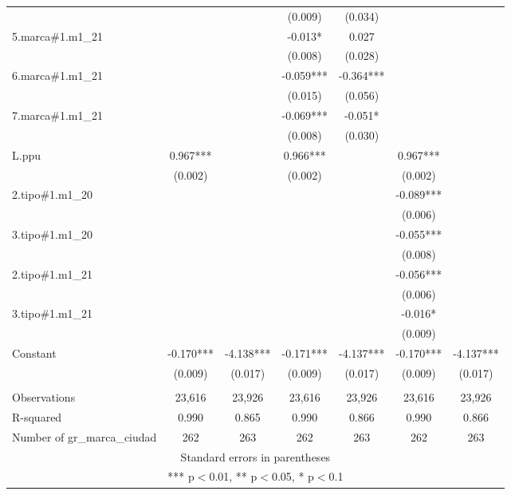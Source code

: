 \begin{tabular}{lcccccc}
 &  &  & (0.009) & (0.034) &  &  \\
5.marca\#1.m1\_21 &  &  & -0.013* & 0.027 &  &  \\
 &  &  & (0.008) & (0.028) &  &  \\
6.marca\#1.m1\_21 &  &  & -0.059*** & -0.364*** &  &  \\
 &  &  & (0.015) & (0.056) &  &  \\
7.marca\#1.m1\_21 &  &  & -0.069*** & -0.051* &  &  \\
 &  &  & (0.008) & (0.030) &  &  \\
L.ppu & 0.967*** &  & 0.966*** &  & 0.967*** &  \\
& (0.002) &  & (0.002) &  & (0.002) &  \\
2.tipo\#1.m1\_20 &  &  &  &  & -0.089*** &  \\
 &  &  &  &  & (0.006) &  \\
3.tipo\#1.m1\_20 &  &  &  &  & -0.055*** &  \\
 &  &  &  &  & (0.008) &  \\
2.tipo\#1.m1\_21 &  &  &  &  & -0.056*** &  \\
 &  &  &  &  & (0.006) &  \\
3.tipo\#1.m1\_21 &  &  &  &  & -0.016* &  \\
 &  &  &  &  & (0.009) &  \\
Constant & -0.170*** & -4.138*** & -0.171*** & -4.137*** & -0.170*** & -4.137*** \\
 & (0.009) & (0.017) & (0.009) & (0.017) & (0.009) & (0.017) \\
 &  &  &  &  &  &  \\
Observations & 23,616 & 23,926 & 23,616 & 23,926 & 23,616 & 23,926 \\
R-squared & 0.990 & 0.865 & 0.990 & 0.866 & 0.990 & 0.866 \\
 Number of gr\_marca\_ciudad & 262 & 263 & 262 & 263 & 262 & 263 \\ \hline
\multicolumn{7}{c}{ Standard errors in parentheses} \\
\multicolumn{7}{c}{ *** p$<$0.01, ** p$<$0.05, * p$<$0.1} \\
\end{tabular}
